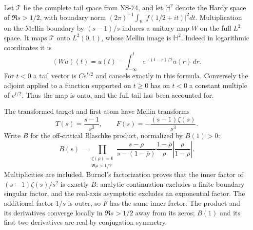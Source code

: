 Let $\mathcal T$ be the complete tail space from NS-74, and let
$\mathbb H^2$ denote the Hardy space of $\Re s>1/2$, with boundary norm
$(2\pi)^{-1}\int_{\mathbb R}|f(1/2+it)|^2dt$.
Multiplication on the Mellin boundary by $(s-1)/s$ induces a unitary
map $W$ on the full $L^2$ space. It maps $\mathcal T$ onto
$L^2(0,1)$, whose Mellin image is $\mathbb H^2$.
Indeed in logarithmic coordinates it is
\[
 (Wu)(t)=u(t)-\int_{-\infty}^t e^{-(t-r)/2}u(r)\,dr.
\]
For $t<0$ a tail vector is $C e^{t/2}$ and cancels exactly in this
formula. Conversely the adjoint applied to a function supported on
$t\geq0$ has on $t<0$ a constant multiple of $e^{t/2}$.
Thus the map is onto, and the full tail has been accounted for.

The transformed target and first atom have Mellin transforms
\[
 T(s)=\frac{s-1}{s^3},\qquad
 F(s)=-\frac{(s-1)\zeta(s)}{s^3}.
\]
Write $B$ for the off-critical Blaschke product, normalized by $B(1)>0$:
\[
 B(s)=\prod_{\substack{\zeta(\rho)=0\\\Re\rho>1/2}}
 \frac{s-\rho}{s-(1-\overline\rho)}
 \frac{1-\overline\rho}{\rho}
 \left|\frac{\rho}{1-\rho}\right|.
\]
Multiplicities are included. Burnol's factorization proves that the
inner factor of $(s-1)\zeta(s)/s^2$ is exactly $B$: analytic
continuation excludes a finite-boundary singular factor, and the
real-axis asymptotic excludes an exponential factor. The additional
factor $1/s$ is outer, so $F$ has the same inner factor. The product
and its derivatives converge locally in $\Re s>1/2$ away from its
zeros; $B(1)$ and its first two derivatives are real by conjugation
symmetry.

